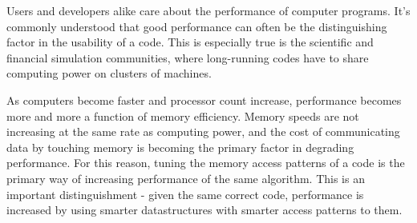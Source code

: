 \documentclass[annual]{acmsiggraph}
\begin{document}
% 
  
  Users and developers alike care about the performance of computer programs. It's commonly understood that good performance can often be the distinguishing factor in the usability of a code. This is especially true is the scientific and financial simulation communities, where long-running codes have to share computing power on clusters of machines.
  
  As computers become faster and processor count increase, performance becomes more and more a function of memory efficiency. Memory speeds are not increasing at the same rate as computing power, and the cost of communicating data by touching memory is becoming the primary factor in degrading performance. For this reason, tuning the memory access patterns of a code is the primary way of increasing performance of the same algorithm. This is an important distinguishment - given the same correct code, performance is increased by using smarter datastructures with smarter access patterns to them.
  
\end{document}
